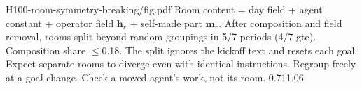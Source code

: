 {H100-room-symmetry-breaking/fig.pdf}
{Room content = day field + agent constant + operator field $\mathbf h_r$ + self-made part $\mathbf m_r$.}
{After composition and field removal, rooms split beyond random groupings in 5/7 periods (4/7 gte). Composition share $\le$0.18. The split ignores the kickoff text and resets each goal.}
{Expect separate rooms to diverge even with identical instructions. Regroup freely at a goal change. Check a moved agent's work, not its room.}
{0.71}{1.06}
